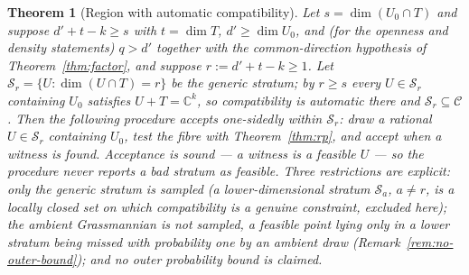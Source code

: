 \documentclass[journal]{IEEEtran}
\theoremstyle{plainn}
\newtheorem{thm}{Theorem}
\theoremstyle{remark}
\begin{document}
\begin{thm}[Region with automatic compatibility]\label{thm:regime}
Let $s=\dim(U_0\cap T)$ and suppose $d'+t-k\ge s$ with $t=\dim T$, $d'\ge\dim U_0$, and (for the
openness and density statements) $q>d'$ together with the common-direction hypothesis of
Theorem~\ref{thm:factor}, and suppose $r:=d'+t-k\ge1$. Let
$\mathcal S_r=\{U:\dim(U\cap T)=r\}$ be the \emph{generic} stratum; by $r\ge s$ every $U\in\mathcal
S_r$ containing $U_0$ satisfies $U+T=\mathbb C^{k}$, so compatibility is automatic there and
$\mathcal S_r\subseteq\mathcal C$. Then the following procedure accepts one-sidedly \emph{within
$\mathcal S_r$}: draw a rational $U\in\mathcal S_r$ containing $U_0$, test the fibre with
Theorem~\ref{thm:rp}, and accept when a witness is found. Acceptance is sound --- a witness is a feasible
$U$ --- so the procedure never reports a bad stratum as feasible. Three restrictions are explicit: only
the generic stratum is sampled (a lower-dimensional stratum $\mathcal S_a$, $a\neq r$, is a locally closed
set on which compatibility is a genuine constraint, excluded here); the ambient Grassmannian is not
sampled, a feasible point lying only in a lower stratum being missed with probability one by an ambient
draw (Remark~\ref{rem:no-outer-bound}); and no outer probability bound is claimed.
\end{thm}
\end{document}
